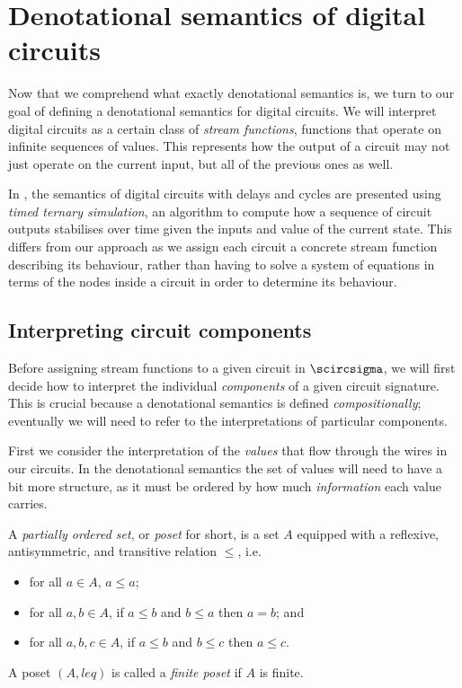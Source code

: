 \section{Denotational semantics of digital circuits}\label{sec:circuits}

Now that we comprehend what exactly denotational semantics is, we turn to our
goal of defining a denotational semantics for digital circuits.
We will interpret digital circuits as a certain class of
\emph{stream functions}, functions that operate on infinite sequences of values.
This represents how the output of a circuit may not just operate on the current
input, but all of the previous ones as well.

\begin{remark}
    In \cite{mendler2012constructive}, the semantics of digital circuits with
    delays and cycles are presented using \emph{timed ternary simulation}, an
    algorithm to compute how a sequence of circuit outputs stabilises over time
    given the inputs and value of the current state.
    This differs from our approach as we assign each circuit a concrete stream
    function describing its behaviour, rather than having to solve a system of
    equations in terms of the nodes inside a circuit in order to determine its
    behaviour.
\end{remark}

\subsection{Interpreting circuit components}\label{sec:interpreting-components}

Before assigning stream functions to a given circuit in \(\scircsigma\), we will
first decide how to interpret the individual \emph{components} of a given
circuit signature.
This is crucial because a denotational semantics is defined
\emph{compositionally}; eventually we will need to refer to the interpretations
of particular components.

First we consider the interpretation of the \emph{values} that flow through the
wires in our circuits.
In the denotational semantics the set of values will need to have a bit more
structure, as it must be ordered by how much \emph{information} each value
carries.

\begin{definition}
    A \emph{partially ordered set}, or \emph{poset} for short, is a set \(A\)
    equipped with a reflexive, antisymmetric, and transitive relation \(\leq\),
    i.e.\
    \begin{itemize}
        \item for all \(a \in A\), \(a \leq a\);
        \item for all \(a, b \in A\), if \(a \leq b\) and \(b \leq a\) then
              \(a = b\); and
        \item for all \(a, b, c \in A\), if \(a \leq b\) and \(b \leq c\) then
              \(a \leq c\).
    \end{itemize}
    A poset \((A, leq)\) is called a \emph{finite poset} if \(A\) is finite.
\end{definition}

